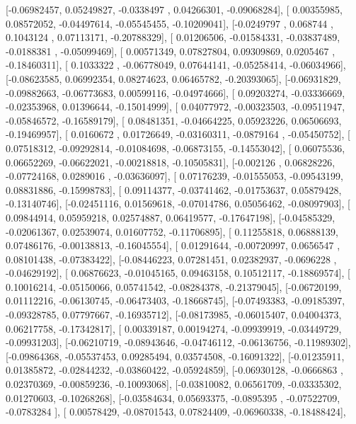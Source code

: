 \documentclass{article}
\begin{document}
       [-0.06982457,  0.05249827, -0.0338497 ,  0.04266301, -0.09068284],
       [ 0.00355985,  0.08572052, -0.04497614, -0.05545455, -0.10209041],
       [-0.0249797 ,  0.068744  ,  0.1043124 ,  0.07113171, -0.20788329],
       [ 0.01206506, -0.01584331, -0.03837489, -0.0188381 , -0.05099469],
       [ 0.00571349,  0.07827804,  0.09309869,  0.0205467 , -0.18460311],
       [ 0.1033322 , -0.06778049,  0.07644141, -0.05258414, -0.06034966],
       [-0.08623585,  0.06992354,  0.08274623,  0.06465782, -0.20393065],
       [-0.06931829, -0.09882663, -0.06773683,  0.00599116, -0.04974666],
       [ 0.09203274, -0.03336669, -0.02353968,  0.01396644, -0.15014999],
       [ 0.04077972, -0.00323503, -0.09511947, -0.05846572, -0.16589179],
       [ 0.08481351, -0.04664225,  0.05923226,  0.06506693, -0.19469957],
       [ 0.0160672 ,  0.01726649, -0.03160311, -0.0879164 , -0.05450752],
       [ 0.07518312, -0.09292814, -0.01084698, -0.06873155, -0.14553042],
       [ 0.06075536,  0.06652269, -0.06622021, -0.00218818, -0.10505831],
       [-0.002126  ,  0.06828226, -0.07724168,  0.0289016 , -0.03636097],
       [ 0.07176239, -0.01555053, -0.09543199,  0.08831886, -0.15998783],
       [ 0.09114377, -0.03741462, -0.01753637,  0.05879428, -0.13140746],
       [-0.02451116,  0.01569618, -0.07014786,  0.05056462, -0.08097903],
       [ 0.09844914,  0.05959218,  0.02574887,  0.06419577, -0.17647198],
       [-0.04585329, -0.02061367,  0.02539074,  0.01607752, -0.11706895],
       [ 0.11255818,  0.06888139,  0.07486176, -0.00138813, -0.16045554],
       [ 0.01291644, -0.00720997,  0.0656547 ,  0.08101438, -0.07383422],
       [-0.08446223,  0.07281451,  0.02382937, -0.0696228 , -0.04629192],
       [ 0.06876623, -0.01045165,  0.09463158,  0.10512117, -0.18869574],
       [ 0.10016214, -0.05150066,  0.05741542, -0.08284378, -0.21379045],
       [-0.06720199,  0.01112216, -0.06130745, -0.06473403, -0.18668745],
       [-0.07493383, -0.09185397, -0.09328785,  0.07797667, -0.16935712],
       [-0.08173985, -0.06015407,  0.04004373,  0.06217758, -0.17342817],
       [ 0.00339187,  0.00194274, -0.09939919, -0.03449729, -0.09931203],
       [-0.06210719, -0.08943646, -0.04746112, -0.06136756, -0.11989302],
       [-0.09864368, -0.05537453,  0.09285494,  0.03574508, -0.16091322],
       [-0.01235911,  0.01385872, -0.02844232, -0.03860422, -0.05924859],
       [-0.06930128, -0.0666863 ,  0.02370369, -0.00859236, -0.10093068],
       [-0.03810082,  0.06561709, -0.03335302,  0.01270603, -0.10268268],
       [-0.03584634,  0.05693375, -0.0895395 , -0.07522709, -0.0783284 ],
       [ 0.00578429, -0.08701543,  0.07824409, -0.06960338, -0.18488424],
\end{document}
